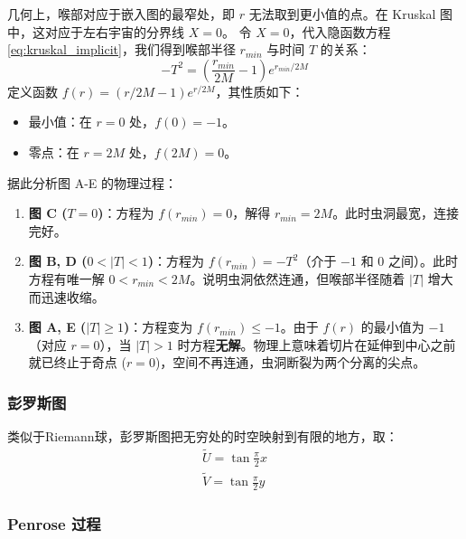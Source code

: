 \begin{derivationnote}[喉部半径的演化]
    几何上，喉部对应于嵌入图的最窄处，即 $r$ 无法取到更小值的点。在 Kruskal 图中，这对应于左右宇宙的分界线 $X=0$。
    令 $X=0$，代入隐函数方程 \eqref{eq:kruskal_implicit}，我们得到喉部半径 $r_{min}$ 与时间 $T$ 的关系：
    \begin{equation}
        -T^2 = \left(\frac{r_{min}}{2M} - 1\right) e^{r_{min}/2M}
    \end{equation}
    定义函数 $f(r) = (r/2M - 1)e^{r/2M}$，其性质如下：
    \begin{itemize}
        \item 最小值：在 $r=0$ 处，$f(0) = -1$。
        \item 零点：在 $r=2M$ 处，$f(2M) = 0$。
    \end{itemize}
    据此分析图 A-E 的物理过程：
    \begin{enumerate}
        \item \textbf{图 C ($T=0$)}：方程为 $f(r_{min}) = 0$，解得 $r_{min} = 2M$。此时虫洞最宽，连接完好。
        \item \textbf{图 B, D ($0 < |T| < 1$)}：方程为 $f(r_{min}) = -T^2$（介于 $-1$ 和 $0$ 之间）。此时方程有唯一解 $0 < r_{min} < 2M$。说明虫洞依然连通，但喉部半径随着 $|T|$ 增大而迅速收缩。
        \item \textbf{图 A, E ($|T| \geq 1$)}：方程变为 $f(r_{min}) \leq -1$。由于 $f(r)$ 的最小值为 $-1$（对应 $r=0$），当 $|T| > 1$ 时方程\textbf{无解}。物理上意味着切片在延伸到中心之前就已终止于奇点 ($r=0$)，空间不再连通，虫洞断裂为两个分离的尖点。
    \end{enumerate}
\end{derivationnote}
\subsubsection{彭罗斯图}
类似于Riemann球，彭罗斯图把无穷处的时空映射到有限的地方，取：
\begin{align}
    \widetilde{U} = \tan{\frac{\pi}{2}x} \\
    \widetilde{V} = \tan{\frac{\pi}{2}y}
\end{align}
\subsubsection{Penrose 过程}

